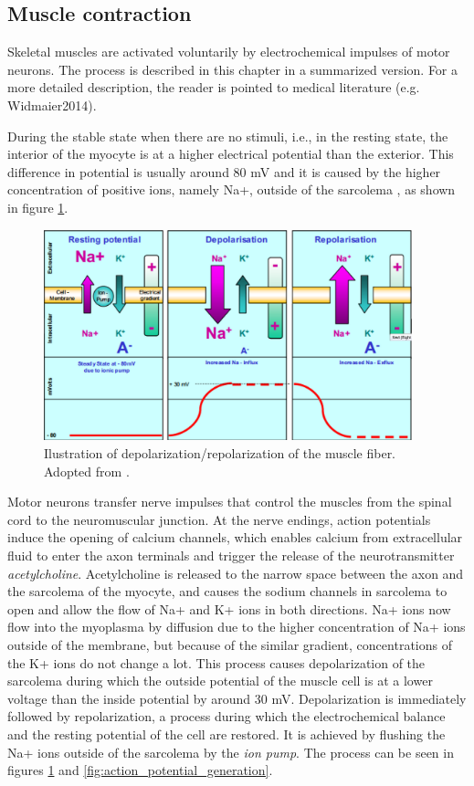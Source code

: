 \subsection{Muscle contraction} \label{sc:contraction}

Skeletal muscles are activated voluntarily by electrochemical impulses of motor neurons. The process is described in this chapter in a summarized version. For a more detailed description, the reader is pointed to medical literature (e.g. {Widmaier2014}).

During the stable state when there are no stimuli, i.e., in the resting state, the interior of the myocyte is at a higher electrical potential than the exterior. This difference in potential is usually around 80 mV and it is caused by the higher concentration of positive ions, namely Na+, outside of the sarcolema \citep{Nazmi2016}, as shown in figure \ref{fig:depolarization}.

\begin{figure}[ht]
\centering
\includegraphics[width=0.95\textwidth]{Images/introduction/Depolarization.png}
\caption{Ilustration of depolarization/repolarization of the muscle fiber. Adopted from \citet{Nazmi2016}.}
\label{fig:depolarization}
\end{figure}

Motor neurons transfer nerve impulses that control the muscles from the spinal cord to the neuromuscular junction. At the nerve endings, action potentials induce the opening of calcium channels, which enables calcium from extracellular fluid to enter the axon terminals and trigger the release of the neurotransmitter \emph{acetylcholine}. Acetylcholine is released to the narrow space between the axon and the sarcolema of the myocyte, and causes the sodium channels in sarcolema to open and allow the flow of Na+ and K+ ions in both directions. Na+ ions now flow into the myoplasma by diffusion due to the higher concentration of Na+ ions outside of the membrane, but because of the similar gradient, concentrations of the K+ ions do not change a lot. This process causes depolarization of the sarcolema during which the outside potential of the muscle cell is at a lower voltage than the inside potential by around 30 mV. Depolarization is immediately followed by repolarization, a process during which the electrochemical balance and the resting potential of the cell are restored. It is achieved by flushing the Na+ ions outside of the sarcolema by the \emph{ion pump}. The process can be seen in figures \ref{fig:depolarization} and \ref{fig:action_potential_generation}.
  
